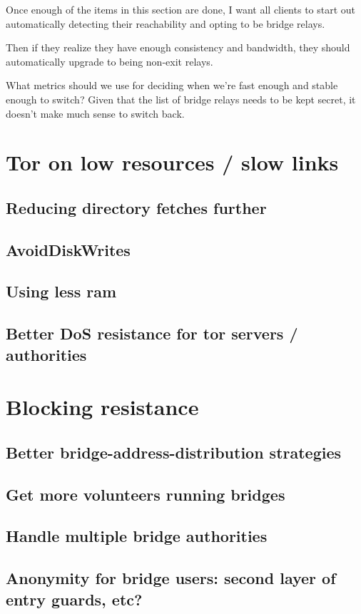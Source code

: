 \documentclass{article}
\begin{document}
Once enough of the items in this section are done, I want all clients
to start out automatically detecting their reachability and opting
to be bridge relays.

Then if they realize they have enough consistency and bandwidth, they
should automatically upgrade to being non-exit relays.

What metrics should we use for deciding when we're fast enough
and stable enough to switch? Given that the list of bridge relays needs
to be kept secret, it doesn't make much sense to switch back.

\section{Tor on low resources / slow links}
\subsection{Reducing directory fetches further}
\label{subsec:fewer-descriptor-fetches}
\subsection{AvoidDiskWrites}
\subsection{Using less ram}
\subsection{Better DoS resistance for tor servers / authorities}
\section{Blocking resistance}
\subsection{Better bridge-address-distribution strategies}
\subsection{Get more volunteers running bridges}
\subsection{Handle multiple bridge authorities}
\subsection{Anonymity for bridge users: second layer of entry guards, etc?}
\end{document}
